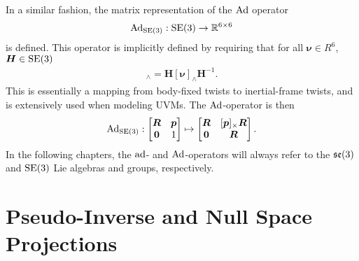 In a similar fashion, the matrix representation of the $\operatorname{Ad}$ operator
\begin{align}
    \operatorname{Ad}_{\operatorname{SE}(3)} : \operatorname{SE}(3) \to \mathbb{R}^{6 \times 6}
\end{align}
is defined. This operator is implicitly defined by requiring that for all
$\bm{\nu} \in R^6$, $\bm{H} \in \operatorname{SE}(3)$
\begin{align}
    [\Ad(\bm{H})\bm{\nu}]_{\wedge} = \bm{H} [\bm{\nu}]_{\wedge} \bm{H}^{-1}.
\end{align}
This is essentially a mapping from body-fixed twists to inertial-frame twists,
and is extensively used when modeling UVMs. The $\operatorname{Ad}$-operator is then
\begin{align}
    \operatorname{Ad}_{\operatorname{SE}(3)} : \begin{bmatrix}
        \bm{R} & \bm{p} \\
        \bm{0} & 1
    \end{bmatrix}
    \mapsto
    \begin{bmatrix}
        \bm{R} & [\bm{p}]_{\times} \bm{R} \\
        \bm{0} & \bm{R}
    \end{bmatrix}.
\end{align}
In the following chapters, the $\operatorname{ad}$- and $\operatorname{Ad}$-operators will always refer to
the $\mathfrak{se}(3)$ and $\operatorname{SE}(3)$ Lie algebras and groups, respectively.

\section{Pseudo-Inverse and Null Space Projections}
\label{sec:pseudoinverse}

